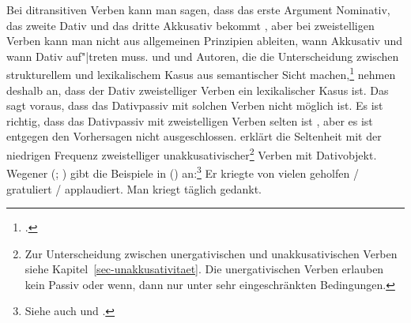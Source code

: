 Bei ditransitiven Verben kann man sagen, dass das erste Argument Nominativ, das zweite
Dativ und das dritte Akkusativ bekommt \citep[49]{Wunderlich97a}, aber bei zweistelligen Verben kann man nicht aus allgemeinen
Prinzipien ableiten, wann Akkusativ und wann Dativ auf"|treten muss.
 und
\citet[]{Stechow90a} und Autoren, die die Unterscheidung zwischen
strukturellem und lexikalischem Kasus aus semantischer Sicht machen,\footnote{
  \textcites[]{Kaufmann95a}[--26]{Stiebels96a}[]{Olsen97c}[, 129]{Rapp97a}[]{Wunderlich97a}.%
}
nehmen deshalb an,
dass der Dativ zweistelliger Verben ein lexikalischer Kasus ist.
Das sagt voraus, dass das Dativpassiv mit solchen Verben nicht möglich ist.
Es ist richtig, dass das Dativpassiv mit zweistelligen Verben selten ist \citep{HW95a},
aber es ist entgegen den Vorhersagen nicht ausgeschlossen.  \citet[]{Wegener90} erklärt die
Seltenheit mit der niedrigen Frequenz zweistelliger unakkusativischer\footnote{ 
  Zur Unterscheidung zwischen unergativischen und unakkusativischen Verben 
  siehe Kapitel~\ref{sec-unakkusativitaet}. Die unergativischen Verben erlauben kein Passiv
  oder wenn, dann nur unter sehr eingeschränkten Bedingungen.%
}
Verben mit Dativobjekt.
Wegener (\citeyear[]{Wegener85a}; \citeyear[]{Wegener90}) 
gibt die Beispiele in () an:\footnote{
        Siehe auch  und .
}
\eal
\label{ex-er-kriegte-geholfen}
\ex{}
Er kriegte von vielen geholfen / gratuliert / applaudiert.
\ex{} 
Man kriegt täglich gedankt.
\zl

